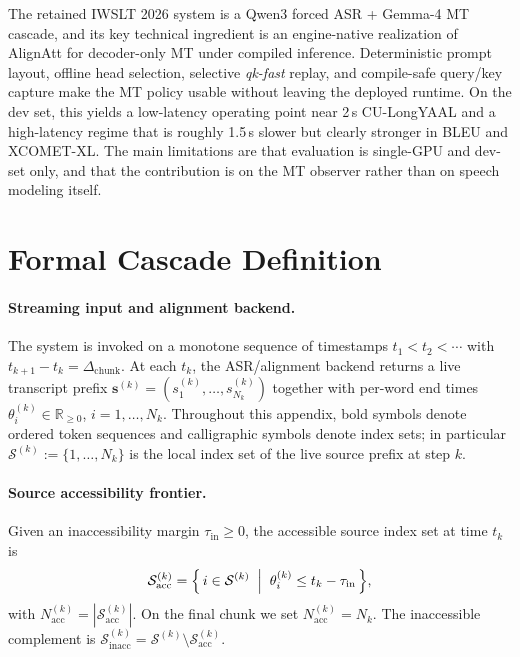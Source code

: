 \documentclass[11pt]{article}
\begin{document}
The retained IWSLT 2026 system is a Qwen3 forced ASR + Gemma-4 MT cascade, and
its key technical ingredient is an engine-native realization of AlignAtt for
decoder-only MT under compiled inference. Deterministic prompt layout, offline
head selection, selective \emph{qk-fast} replay, and compile-safe query/key
capture make the MT policy usable without leaving the deployed runtime. On the
dev set, this yields a low-latency operating point near 2\,s CU-LongYAAL and a
high-latency regime that is roughly 1.5\,s slower but clearly stronger in
BLEU and XCOMET-XL. The main limitations are that evaluation is single-GPU and
dev-set only, and that the contribution is on the MT observer rather than on
speech modeling itself.



\appendix

\section{Formal Cascade Definition}
\label{sec:cascade}

\paragraph{Streaming input and alignment backend.}
The system is invoked on a monotone sequence of timestamps
$t_1 < t_2 < \cdots$ with $t_{k+1} - t_k = \Delta_{\mathrm{chunk}}$.
At each $t_k$, the ASR/alignment backend returns a live transcript prefix
$\mathbf{s}^{(k)} = (s^{(k)}_1, \ldots, s^{(k)}_{N_k})$ together with per-word
end times $\theta^{(k)}_i \in \mathbb{R}_{\geq 0}$, $i=1,\ldots,N_k$.
Throughout this appendix, bold symbols denote ordered token sequences and
calligraphic symbols denote index sets; in particular
$\mathcal{S}^{(k)} := \{1,\ldots,N_k\}$ is the local index set of the live
source prefix at step $k$.

\paragraph{Source accessibility frontier.}
Given an inaccessibility margin $\tau_{\mathrm{in}} \ge 0$, the accessible
source index set at time $t_k$ is
\begin{equation}
  \mathcal{S}^{(k)}_{\mathrm{acc}}
  = \Bigl\{\, i \in \mathcal{S}^{(k)}
     \;\Bigm|\; \theta^{(k)}_i \le t_k - \tau_{\mathrm{in}} \,\Bigr\},
  \label{eq:frontier}
\end{equation}
with $N^{(k)}_{\mathrm{acc}} = |\mathcal{S}^{(k)}_{\mathrm{acc}}|$. On the
final chunk we set $N^{(k)}_{\mathrm{acc}} = N_k$. The inaccessible complement
is $\mathcal{S}^{(k)}_{\mathrm{inacc}} =
\mathcal{S}^{(k)} \setminus \mathcal{S}^{(k)}_{\mathrm{acc}}$.
\end{document}

